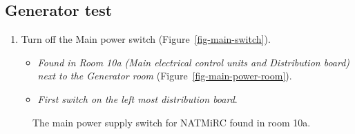 \documentclass[
  12pt,
]{report}
\providecommand{\tightlist}{%
  \setlength{\itemsep}{0pt}\setlength{\parskip}{0pt}}\usepackage{longtable,booktabs,array}
\begin{document}
\hypertarget{sec-gen-test}{%
\subsection{Generator test}\label{sec-gen-test}}

\begin{enumerate}
\def\labelenumi{\arabic{enumi}.}
\setcounter{enumi}{5}
\tightlist
\item
  Turn off the Main power switch (Figure~\ref{fig-main-switch}).

  \begin{itemize}
  \tightlist
  \item
    \emph{Found in Room 10a (Main electrical control units and
    Distribution board) next to the Generator room}
    (Figure~\ref{fig-main-power-room}).
  \item
    \emph{First switch on the left most distribution board}.
  \end{itemize}
\end{enumerate}

\begin{figure}[H]

\begin{minipage}[t]{0.50\linewidth}

{\centering 


}

\end{minipage}%
%
\begin{minipage}[t]{0.50\linewidth}

{\centering 


}

\end{minipage}%

\caption{\label{fig-mains-comp}The main power supply switch for NATMiRC
found in room 10a.}

\end{figure}
\end{document}

